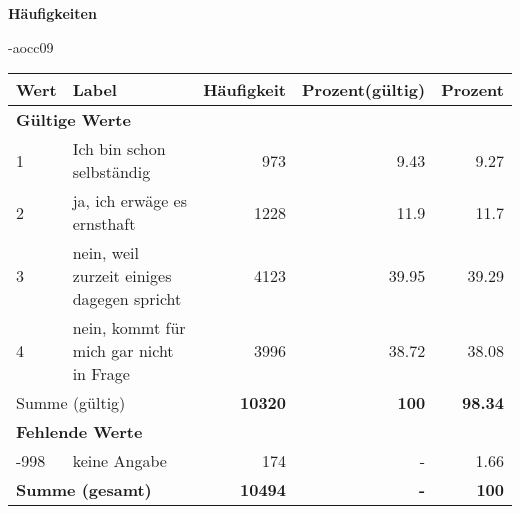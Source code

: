         		\vspace*{0.5cm}
                \noindent\textbf{Häufigkeiten}

                \vspace*{-\baselineskip}
					\begin{filecontents}{\jobname-aocc09}
					\begin{longtable}{lXrrr}
					\toprule
					\textbf{Wert} & \textbf{Label} & \textbf{Häufigkeit} & \textbf{Prozent(gültig)} & \textbf{Prozent} \\
					\endhead
					\midrule
					\multicolumn{5}{l}{\textbf{Gültige Werte}}\\

					1 &
					\multicolumn{1}{X}{ Ich bin schon selbständig   } &


					  \num{973} &
					  \num[round-mode=places,round-precision=2]{9.43} &
					    \num[round-mode=places,round-precision=2]{9.27} \\

					2 &
					\multicolumn{1}{X}{ ja, ich erwäge es ernsthaft   } &


					  \num{1228} &
					  \num[round-mode=places,round-precision=2]{11.9} &
					    \num[round-mode=places,round-precision=2]{11.7} \\

					3 &
					\multicolumn{1}{X}{ nein, weil zurzeit einiges dagegen spricht   } &


					  \num{4123} &
					  \num[round-mode=places,round-precision=2]{39.95} &
					    \num[round-mode=places,round-precision=2]{39.29} \\

					4 &
					\multicolumn{1}{X}{ nein, kommt für mich gar nicht in Frage   } &


					  \num{3996} &
					  \num[round-mode=places,round-precision=2]{38.72} &
					    \num[round-mode=places,round-precision=2]{38.08} \\
					\midrule
					\multicolumn{2}{l}{Summe (gültig)} &
					  \textbf{\num{10320}} &
					\textbf{\num{100}} &
					  \textbf{\num[round-mode=places,round-precision=2]{98.34}} \\
					\multicolumn{5}{l}{\textbf{Fehlende Werte}}\\
							-998 &
							keine Angabe &
							  \num{174} &
							 - &
							  \num[round-mode=places,round-precision=2]{1.66} \\
					\midrule
					\multicolumn{2}{l}{\textbf{Summe (gesamt)}} &
				      \textbf{\num{10494}} &
				    \textbf{-} &
				    \textbf{\num{100}} \\
					\bottomrule
					\end{longtable}
					\end{filecontents}
